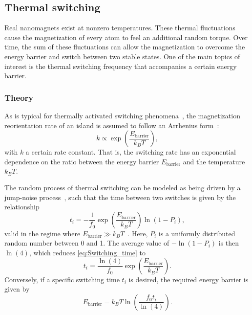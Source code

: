 \documentclass[11pt,a4paper,english,twoside]{article}
\begin{document}
\FloatBarrier
\subsection{Thermal switching}
Real nanomagnets exist at nonzero temperatures. These thermal fluctuations cause the magnetization of every atom to feel an additional random torque. Over time, the sum of these fluctuations can allow the magnetization to overcome the energy barrier and switch between two stable states. One of the main topics of interest is the thermal switching frequency that accompanies a certain energy barrier.

\subsubsection{Theory}
As is typical for thermally activated switching phenomena~\cite{MagDynamics_JumpNoise}, the magnetization reorientation rate of an island is assumed to follow an Arrhenius form~\cite{FAR-13}:
\begin{equation}
    k \propto \exp(\frac{E_{\mathrm{barrier}}}{k_B T}) \mathrm{,}
\end{equation}
with $k$ a certain rate constant. That is, the switching rate has an exponential dependence on the ratio between the energy barrier $E_{\mathrm{barrier}}$ and the temperature $k_B T$. \par %
The random process of thermal switching can be modeled as being driven by a jump-noise process~\cite{MagDynamics_JumpNoise}, such that the time between two switches is given by the relationship
\begin{equation}
    t_i = -\frac{1}{f_0} \exp(\frac{E_\mathrm{barrier}}{k_B T}) \ln(1-P_i) \mathrm{,}
    \label{eq:Switching_time}
\end{equation}
valid in the regime where $E_\mathrm{barrier} \gg k_B T$~\cite{GYP-18,RandomSwitch_MonteCarlo}. Here, $P_i$ is a uniformly distributed random number between 0 and 1. The average value of $-\ln(1-P_i)$ is then $\ln(4)$, which reduces \cref{eq:Switching_time} to
\begin{equation}
    t_i = \frac{\ln(4)}{f_0} \exp(\frac{E_\mathrm{barrier}}{k_B T})  \mathrm{.}
    \label{eq:Switching_time_average}
\end{equation}
Conversely, if a specific switching time $t_i$ is desired, the required energy barrier is given by
\begin{equation}
    E_\mathrm{barrier} = k_B T \ln(\frac{f_0 t_i}{\ln(4)}) \mathrm{.}
\end{equation}
\end{document}
